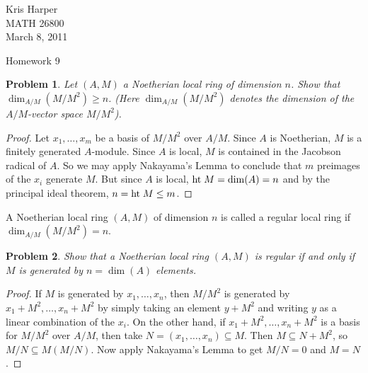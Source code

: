 \documentclass{article}
\newcommand{\Ht}{\textup{ht}\;}
\newtheorem{problem}{Problem}
\begin{document}
\begin{flushright}
Kris Harper\\

MATH 26800\\

March 8, 2011
\end{flushright}

\begin{center}
Homework 9
\end{center}

\begin{problem}
Let $(A,M)$ a Noetherian local ring of dimension $n$. Show that $\dim_{A/M}(M/M^2) \geq n$. (Here $\dim_{A/M}(M/M^2)$ denotes the dimension of the $A/M$-vector space $M/M^2$).
\end{problem}
\begin{proof}
Let $x_1, \dots , x_m$ be a basis of $M/M^2$ over $A/M$. Since $A$ is Noetherian, $M$ is a finitely generated $A$-module. Since $A$ is local, $M$ is contained in the Jacobson radical of $A$. So we may apply Nakayama's Lemma to conclude that $m$ preimages of the $x_i$ generate $M$. But since $A$ is local, $\Ht M = \dim(A) = n$ and by the principal ideal theorem, $n = \Ht M \leq m$.
\end{proof}

\noindent
A Noetherian local ring $(A,M)$ of dimension $n$ is called a regular local ring if $\dim_{A/M}(M/M^2) = n$.

\begin{problem}
\label{generators}
Show that a Noetherian local ring $(A,M)$ is regular if and only if $M$ is generated by $n = \dim(A)$ elements.
\end{problem}
\begin{proof}
If $M$ is generated by $x_1, \dots , x_n$, then $M/M^2$ is generated by $x_1 + M^2, \dots , x_n + M^2$ by simply taking an element $y + M^2$ and writing $y$ as a linear combination of the $x_i$. On the other hand, if $x_1 + M^2, \dots , x_n + M^2$ is a basis for $M/M^2$ over $A/M$, then take $N = (x_1, \dots , x_n) \subseteq M$. Then $M \subseteq N + M^2$, so $M/N \subseteq M (M/N)$. Now apply Nakayama's Lemma to get $M/N = 0$ and $M = N$.
\end{proof}
\end{document}
